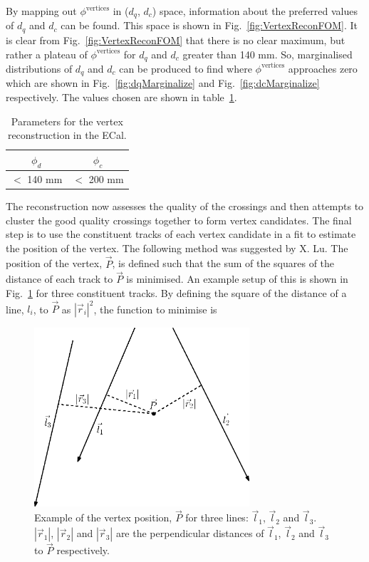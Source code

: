 By mapping out $\phi^{\textrm{vertices}}$ in ($d_q$, $d_c$) space, information about the preferred values of $d_q$ and $d_c$ can be found.  This space is shown in Fig.~\ref{fig:VertexReconFOM}.  It is clear from Fig.~\ref{fig:VertexReconFOM} that there is no clear maximum, but rather a plateau of  $\phi^{\textrm{vertices}}$ for $d_q$ and $d_c$ greater than 140 mm.  So, marginalised distributions of $d_q$ and $d_c$ can be produced to find where $\phi^{\textrm{vertices}}$ approaches zero which are shown in Fig.~\ref{fig:dqMarginalize} and Fig.~\ref{fig:dcMarginalize} respectively.  The values chosen are shown in table~\ref{table:VertexReconParameters}. 
\begin{table}[t!]
  \begin{tabular}{ c c }
    $\phi_d$ & $\phi_c$ \\ \hline \hline
    $<$ 140 mm & $<$ 200 mm \\
  \end{tabular}
  \caption{Parameters for the vertex reconstruction in the ECal.}
  \label{table:VertexReconParameters}
\end{table}
The reconstruction now assesses the quality of the crossings and then attempts to cluster the good quality crossings together to form vertex candidates.  The final step is to use the constituent tracks of each vertex candidate in a fit to estimate the position of the vertex.  The following method was suggested by X. Lu.  The position of the vertex, $\vec{P}$, is defined such that the sum of the squares of the distance of each track to $\vec{P}$ is minimised.  An example setup of this is shown in Fig.~\ref{fig:VertexVectorDiagram} for three constituent tracks.  By defining the square of the distance of a line, $l_i$, to $\vec{P}$ as $|\vec{r}_i|^2$, the function to minimise is
\begin{figure}[!b]
  \centering
  \includegraphics[width=8cm]{images/selection/vertex_recon/vertex_vector_diagram}
  \caption{Example of the vertex position, $\vec{P}$ for three lines: $\vec{l}_1$, $\vec{l}_2$ and $\vec{l}_3$. $|\vec{r}_1|$, $|\vec{r}_2|$ and $|\vec{r}_3|$ are the perpendicular distances of $\vec{l}_1$, $\vec{l}_2$ and $\vec{l}_3$ to $\vec{P}$ respectively.}
  \label{fig:VertexVectorDiagram}
\end{figure}
